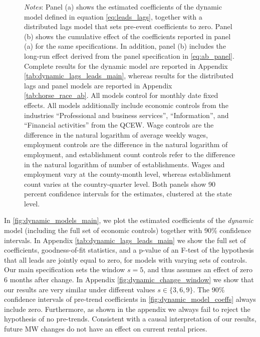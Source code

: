 \begin{figure}[htb!]
\begin{minipage}{0.95\textwidth}
		\vspace{2mm} 
		\textit{Notes}: Panel (a) shows the estimated coefficients of the dynamic model defined 
		in equation \autoref{eq:leads_lags}, together with a distributed lags model that sets 
		pre-event coefficients to zero. Panel (b) shows the cumulative effect of the coefficients 
		reported in panel (a) for the same specifications. In addition, panel (b) includes the 
		long-run effect derived from the panel specification in \autoref{eq:ab_panel}. Complete 
		results for the dynamic model are reported in Appendix 
		\autoref{tab:dynamic_lags_leads_main}, whereas results for the distributed lags and panel 
		models are reported in Appendix \autoref{tab:horse_race_ab}. All models control for 
		monthly date fixed effects. All models additionally  include economic controls from the 
		industries ``Professional and business services'', ``Information'', and ``Financial 
		activities'' from the QCEW. Wage controls are the difference in the natural logarithm of 
		average weekly wages, employment controls are the difference in the natural logarithm of 
		employment, and establishment count controls refer to the difference in the natural 
		logarithm of number of establishments. Wages and employment vary at the county-month 
		level, whereas establishment count varies at the country-quarter level. Both panels
		show 90 percent confidence intervals for the estimates, clustered at the state level. 
	\end{minipage}
\end{figure}


In \autoref{fig:dynamic_models_main}, we plot the estimated coefficients of the \textit{dynamic} 
model (including the full set of economic controls) together with 90\% confidence intervals. In
Appendix \autoref{tab:dynamic_lags_leads_main} we show the full set of coefficients, goodness-of-fit 
statistics, and a p-value of an F-test of the hypothesis that all leads are jointly equal to zero, 
for models with varying sets of controls. Our main specification sets the window $s=5$, and thus
assumes an effect of zero 6 months after change. In Appendix \autoref{fig:dynamic_change_window} 
we show that our results are very similar under different values $s \in \{3, 6, 9\}$. The 90\% 
confidence intervals of pre-trend coefficients in \autoref{fig:dynamic_model_coeffs} always include 
zero. Furthermore, as shown in the appendix we always fail to reject the hypothesis of no pre-trends. 
Consistent with a causal interpretation of our results, future MW changes do not have an effect on 
current rental prices. 

